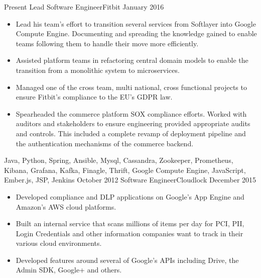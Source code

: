 %
%
%
\begin{experiences}
  \experience
  {Present}  {Lead Software Engineer}{Fitbit}
  {January 2016}   {
                      \begin{itemize}
                        \item Lead his team’s effort to transition several services from Softlayer into Google Compute Engine. Documenting and spreading the knowledge gained to enable teams following them to handle their move more efficiently.
                        \item Assisted platform teams in refactoring central domain models to enable the transition from a monolithic system to microservices.
                        \item Managed one of the cross team, multi national, cross functional projects to ensure Fitbit’s compliance to the EU’s GDPR law.
                        \item Spearheaded the commerce platform SOX compliance efforts. Worked with auditors and stakeholders to ensure engineering provided appropriate audits and controls. This included a complete revamp of deployment pipeline and the authentication mechanisms of the commerce backend.
                      \end{itemize}
                  }
                  {Java, Python, Spring, Ansible, Mysql, Cassandra, Zookeeper, Prometheus, Kibana, Grafana, Kafka, Finagle, Thrift, Google Compute Engine, JavaScript, Ember.js, JSP, Jenkins}
\emptySeparator
  \experience
  {October 2012}  {Software Engineer}{Cloudlock}
  {December 2015}   {
                      \begin{itemize}
                        \item Developed compliance and DLP applications on Google's App Engine and Amazon's AWS cloud platforms.
                        \item Built an internal service that scans millions of items per day for PCI, PII, Login Credentials and other information companies want to track in their various cloud environments.
                        \item Developed features around several of Google's APIs including Drive, the Admin SDK, Google+ and others.

\end{itemize}}
\end{experiences}
